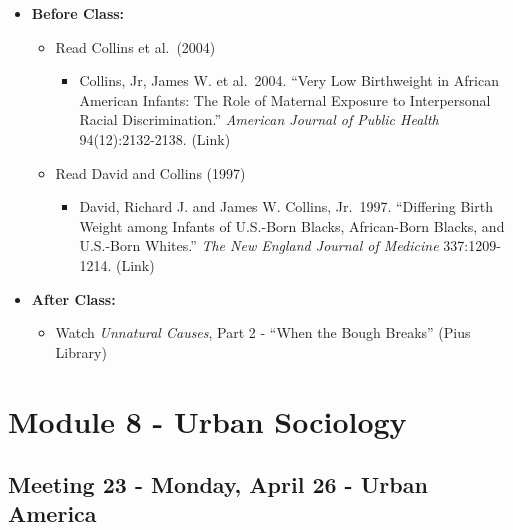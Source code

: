\documentclass[
]{book}
\providecommand{\tightlist}{%
  \setlength{\itemsep}{0pt}\setlength{\parskip}{0pt}}
\begin{document}
\begin{itemize}
\tightlist
\item
  \textbf{Before Class:}

  \begin{itemize}
  \tightlist
  \item
    Read Collins et al.~(2004)

    \begin{itemize}
    \tightlist
    \item
      Collins, Jr, James W. et al.~2004. ``Very Low Birthweight in African American Infants: The Role of Maternal Exposure to Interpersonal Racial Discrimination.'' \emph{American Journal of Public Health} 94(12):2132-2138. (Link)
    \end{itemize}
  \item
    Read David and Collins (1997)

    \begin{itemize}
    \tightlist
    \item
      David, Richard J. and James W. Collins, Jr.~1997. ``Differing Birth Weight among Infants of U.S.-Born Blacks, African-Born Blacks, and U.S.-Born Whites.'' \emph{The New England Journal of Medicine} 337:1209-1214. (Link)
    \end{itemize}
  \end{itemize}
\item
  \textbf{After Class:}

  \begin{itemize}
  \tightlist
  \item
    Watch \emph{Unnatural Causes}, Part 2 - ``When the Bough Breaks'' (Pius Library)
  \end{itemize}
\end{itemize}

\newpage

\hypertarget{module-8---urban-sociology}{%
\section{Module 8 - Urban Sociology}\label{module-8---urban-sociology}}

\hypertarget{meeting-23---monday-april-26---urban-america}{%
\subsection*{Meeting 23 - Monday, April 26 - Urban America}\label{meeting-23---monday-april-26---urban-america}}
\end{document}
